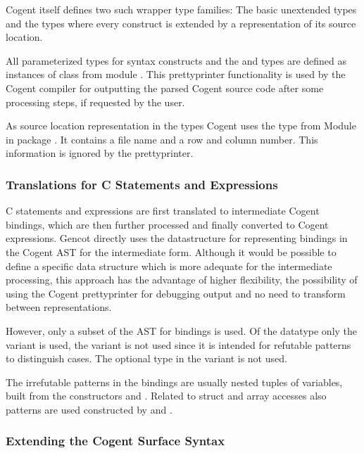 Cogent itself defines two such wrapper type families: The basic unextended types  and the types 
where every construct is extended by a representation of its source location. 

All parameterized types for syntax constructs and the  and  types are defined as instances of 
class  from
module . This prettyprinter functionality is used by the Cogent compiler for outputting
the parsed Cogent source code after some processing steps, if requested by the user.

As source location representation in the  types Cogent uses the type  from Module 
 in package .
It contains a file name and a row and column number. This information is ignored by the prettyprinter.

\subsubsection{Translations for C Statements and Expressions}

C statements and expressions are first translated to intermediate Cogent bindings, which are then further processed
and finally converted to Cogent expressions. Gencot directly uses the datastructure for representing bindings
in the Cogent AST for the intermediate form. Although it would be possible to define a specific data structure
which is more adequate for the intermediate processing, this approach has the advantage of higher flexibility,
the possibility of using the Cogent prettyprinter for debugging output and no need to transform between representations.

However, only a subset of the AST for bindings is used. Of the datatype  only the variant
 is used, the variant  is not used since it is intended for refutable patterns
to distinguish cases. The optional type in the  variant is not used.

The irrefutable patterns in the bindings are usually nested tuples of variables, built from the constructors
 and . Related to struct and array accesses also  patterns are used constructed
by  and .

\subsubsection{Extending the Cogent Surface Syntax}

